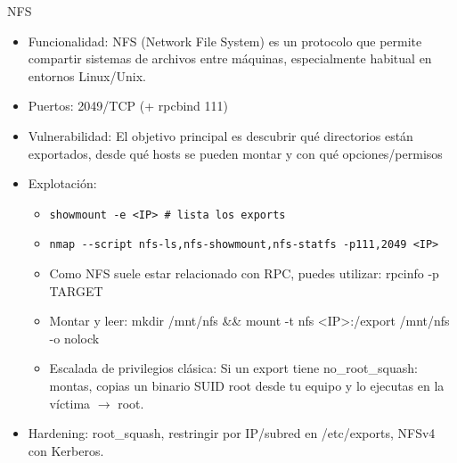 \documentclass[aspectratio=169,11pt]{beamer}
\newcommand{\cmd}[1]{\texttt{#1}}
\begin{document}
\begin{frame}[allowframebreaks]{NFS}
\small
  \begin{itemize}
  \item Funcionalidad: NFS (Network File System) es un protocolo que permite compartir sistemas de archivos entre máquinas, especialmente habitual en entornos Linux/Unix.
  \item Puertos: 2049/TCP (+ rpcbind 111)
  \item Vulnerabilidad: El objetivo principal es descubrir qué directorios están exportados, desde qué hosts se pueden montar y con qué opciones/permisos
  \item Explotación:
    \begin{itemize} 
      \item \cmd{showmount -e <IP> \# lista los exports}
      \item \cmd{nmap -{}-script nfs-ls,nfs-showmount,nfs-statfs -p111,2049 <IP>}
      \item Como NFS suele estar relacionado con RPC, puedes utilizar: rpcinfo -p TARGET
      \item Montar y leer: mkdir /mnt/nfs \&\& mount -t nfs <IP>:/export /mnt/nfs -o nolock
      \item Escalada de privilegios clásica:  Si un export tiene no\_root\_squash: montas, copias un binario SUID root desde tu equipo y lo ejecutas en la víctima $\rightarrow$ root.
  \end{itemize}

  \item Hardening: root\_squash, restringir por IP/subred en /etc/exports, NFSv4 con Kerberos.
  \end{itemize}
\end{frame}

\end{document}

